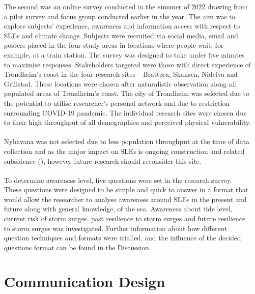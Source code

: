 The second was an online survey conducted in the summer of 2022 drawing from a pilot survey and focus group conducted earlier in the year. The aim was to explore subjects' experience, awareness and information access with respect to SLEs and climate change. Subjects were recruited via social media, email and posters placed in the four study areas in locations where people wait, for example, at a train station. The survey was designed to take under five minutes to maximise responses. Stakeholders targeted were those with direct experience of Trondheim’s coast in the four research sites – Brattøra, Skansen, Nidelva and Grillstad. These locations were chosen after naturalistic observation along all populated areas of Trondheim’s coast. The city of Trondheim was selected due to the potential to utilise researcher's personal network and due to restriction surrounding COVID-19 pandemic. The individual research sites were chosen due to their high throughput of all demographics and perceived physical vulnerability.
\paragraph{}
Nyhavana was not selected due to less population throughput at the time of data collection and as the major impact on SLEs is ongoing construction and related subsidence (\cite{miljoenheten_og_byplankontoret_trondheim_kommune_9-notat-om-havnivastigning-og-stormflo---hensyn-i-arealplanlegging-nyhavnapdf_2020}), however future research should reconsider this site.  
\paragraph{}
To determine awareness level, five questions were set in the research survey. These questions were designed to be simple and quick to answer in a format that would allow the researcher to analyse awareness around SLEs in the present and future along with general knowledge, of the sea. Awareness about tide level, current risk of storm surges, past resilience to storm surges and future resilience to storm surges was investigated. Further information about how different question techniques and formats were trialled, and the influence of the decided questions format can be found in the Discussion.



\section{Communication Design}

